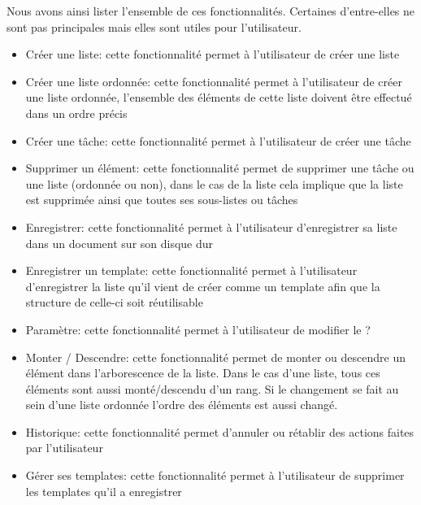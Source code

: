 \documentclass[a4paper,10pt]{article}
\begin{document}
Nous avons ainsi lister l'ensemble de ces fonctionnalités. Certaines d'entre-elles ne sont pas principales mais elles sont utiles pour l'utilisateur.
\begin{itemize}
\item{Créer une liste: cette fonctionnalité permet à l'utilisateur de créer une liste}
\item{Créer une liste ordonnée: cette fonctionnalité permet à l'utilisateur de créer une liste ordonnée, l'ensemble des éléments de cette liste doivent être effectué dans un ordre précis}
\item{Créer une tâche: cette fonctionnalité permet à l'utilisateur de créer une tâche}
\item{Supprimer un élément: cette fonctionnalité permet de supprimer une tâche ou une liste (ordonnée ou non), dans le cas de la liste cela implique que la liste est supprimée ainsi que toutes ses sous-listes ou tâches}
\item{Enregistrer: cette fonctionnalité permet à l'utilisateur d'enregistrer sa liste dans un document sur son disque dur}
\item{Enregistrer un template: cette fonctionnalité permet à l'utilisateur d'enregistrer la liste qu'il vient de créer comme un template afin que la structure de celle-ci soit réutilisable}
\item{Paramètre: cette fonctionnalité permet à l'utilisateur de modifier le ?}
\item{Monter / Descendre: cette fonctionnalité permet de monter ou descendre un élément dans l'arborescence de la liste. Dans le cas d'une liste, tous ces éléments sont aussi monté/descendu d'un rang. Si le changement se fait au sein d'une liste ordonnée l'ordre des éléments est aussi changé.}
\item{Historique: cette fonctionnalité permet d'annuler ou rétablir des actions faites par l'utilisateur}
\item{Gérer ses templates: cette fonctionnalité permet à l'utilisateur de supprimer les templates qu'il a enregistrer}
\end{itemize}

\newpage
\section{}
\end{document}
